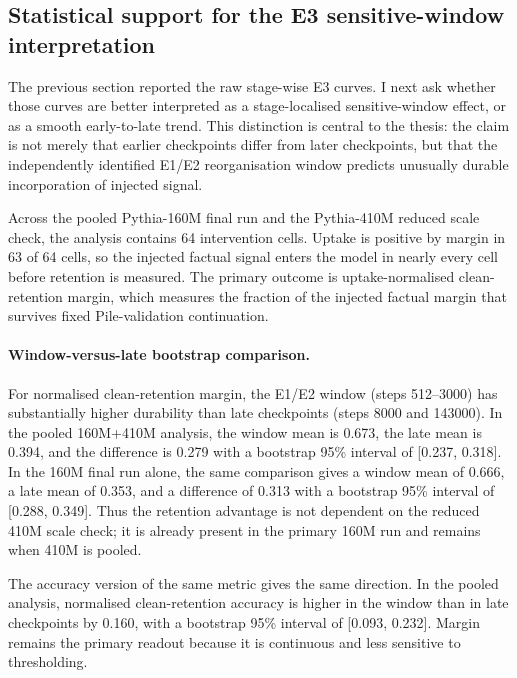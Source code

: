 \subsection{Statistical support for the E3 sensitive-window interpretation}
\label{sec:e3-statistical-strengthening-results}

The previous section reported the raw stage-wise E3 curves.  I next ask whether those curves are better interpreted as a stage-localised sensitive-window effect, or as a smooth early-to-late trend.  This distinction is central to the thesis: the claim is not merely that earlier checkpoints differ from later checkpoints, but that the independently identified E1/E2 reorganisation window predicts unusually durable incorporation of injected signal.

Across the pooled Pythia-160M final run and the Pythia-410M reduced scale check, the analysis contains 64 intervention cells.  Uptake is positive by margin in 63 of 64 cells, so the injected factual signal enters the model in nearly every cell before retention is measured.  The primary outcome is uptake-normalised clean-retention margin, which measures the fraction of the injected factual margin that survives fixed Pile-validation continuation.

\paragraph{Window-versus-late bootstrap comparison.}
For normalised clean-retention margin, the E1/E2 window (steps 512--3000) has substantially higher durability than late checkpoints (steps 8000 and 143000).  In the pooled 160M+410M analysis, the window mean is 0.673, the late mean is 0.394, and the difference is 0.279 with a bootstrap 95\% interval of [0.237, 0.318].  In the 160M final run alone, the same comparison gives a window mean of 0.666, a late mean of 0.353, and a difference of 0.313 with a bootstrap 95\% interval of [0.288, 0.349].  Thus the retention advantage is not dependent on the reduced 410M scale check; it is already present in the primary 160M run and remains when 410M is pooled.

The accuracy version of the same metric gives the same direction.  In the pooled analysis, normalised clean-retention accuracy is higher in the window than in late checkpoints by 0.160, with a bootstrap 95\% interval of [0.093, 0.232].  Margin remains the primary readout because it is continuous and less sensitive to thresholding.

